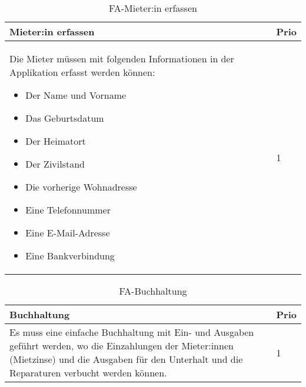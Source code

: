 \begin{table}[H]
  \centering
  \settowidth{}
  \setlength\extrarowheight{2pt}
  \begin{tabulary}{1.0\textwidth}{|m{16cm}|L|}
    \hline
    \textbf{Mieter:in erfassen}&\textbf{Prio}\\
    \hline
    Die Mieter müssen mit folgenden Informationen in der Applikation erfasst werden können:
    \begin{itemize}
      \item Der Name und Vorname
      \item Das Geburtsdatum
      \item Der Heimatort
      \item Der Zivilstand
      \item Die vorherige Wohnadresse
      \item Eine Telefonnummer
      \item Eine E-Mail-Adresse
      \item Eine Bankverbindung
    \end{itemize} & 1\\
    \hline
  \end{tabulary}
  \caption{FA-Mieter:in erfassen}
  \label{faMieterinerfassen}
\end{table}

\begin{table}[H]
  \centering
  \settowidth{}
  \setlength\extrarowheight{2pt}
  \begin{tabulary}{1.0\textwidth}{|m{16cm}|L|}
    \hline
    \textbf{Buchhaltung}&\textbf{Prio}\\
    \hline
      Es muss eine einfache Buchhaltung mit Ein- und Ausgaben geführt werden, wo die Einzahlungen der Mieter:innen (Mietzinse) und die Ausgaben für den Unterhalt und die Reparaturen verbucht werden können.& 1\\
    \hline
  \end{tabulary}
  \caption{FA-Buchhaltung}
  \label{faBuchhaltung}
\end{table}

